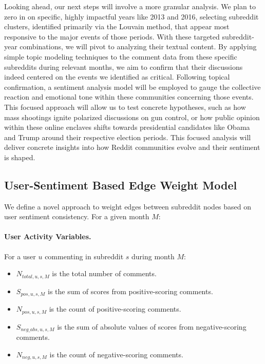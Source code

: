 \documentclass{article}
\theoremstyle{definition}
\begin{document}
Looking ahead, our next steps will involve a more granular analysis. We plan to zero in on specific, highly impactful years like 2013 and 2016, selecting subreddit clusters, identified primarily via the Louvain method, that appear most responsive to the major events of those periods. With these targeted subreddit-year combinations, we will pivot to analyzing their textual content. By applying simple topic modeling techniques to the comment data from these specific subreddits during relevant months, we aim to confirm that their discussions indeed centered on the events we identified as critical. Following topical confirmation, a sentiment analysis model will be employed to gauge the collective reaction and emotional tone within these communities concerning those events. This focused approach will allow us to test concrete hypotheses, such as how mass shootings ignite polarized discussions on gun control, or how public opinion within these online enclaves shifts towards presidential candidates like Obama and Trump around their respective election periods. This focused analysis will deliver concrete insights into how Reddit communities evolve and their sentiment is shaped.


\subsection{User-Sentiment Based Edge Weight Model}

We define a novel approach to weight edges between subreddit nodes based on user sentiment consistency. For a given month $M$:

\paragraph{User Activity Variables.} For a user $u$ commenting in subreddit $s$ during month $M$:
\begin{itemize}
  \item $N_{total,u,s,M}$ is the total number of comments.
  \item $S_{pos,u,s,M}$ is the sum of scores from positive-scoring comments.
  \item $N_{pos,u,s,M}$ is the count of positive-scoring comments.
  \item $S_{neg\_abs,u,s,M}$ is the sum of absolute values of scores from negative-scoring comments.
  \item $N_{neg,u,s,M}$ is the count of negative-scoring comments.
\end{itemize}
\end{document}
